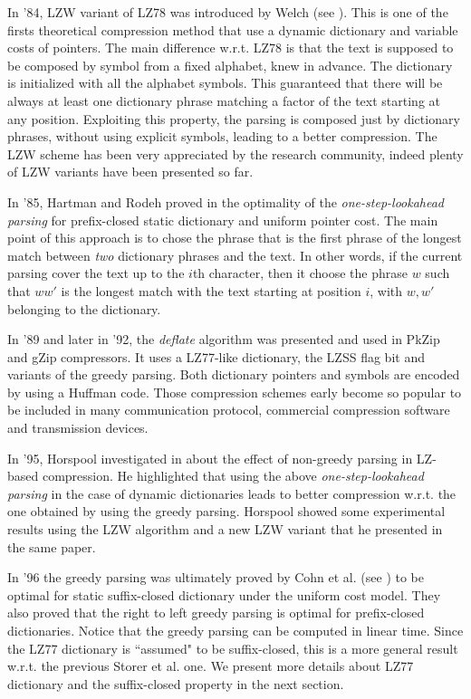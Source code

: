 \documentclass[12pt]{article}
\theoremstyle{plain}
\theoremstyle{definition}
\theoremstyle{remark}
\begin{document}
In '84, LZW variant of LZ78 was introduced by Welch (see \cite{lzw}). This is one of the firsts theoretical compression method that use a dynamic dictionary and variable costs of pointers. The main difference w.r.t. LZ78 is that the text is supposed to be composed by symbol from a fixed alphabet, knew in advance. The dictionary is initialized with all the alphabet symbols. This guaranteed that there will be always at least one dictionary phrase matching a factor of the text starting at any position. Exploiting this property, the parsing is composed just by dictionary phrases, without using explicit symbols, leading to a better compression. The LZW scheme has been very appreciated by the research community, indeed plenty of LZW variants have been presented so far.


In '85, Hartman and Rodeh proved in \cite{rodeh1985} the optimality of the 
\emph{one-step-lookahead parsing} for prefix-closed static dictionary and uniform pointer cost. The main point of this approach is to chose the phrase that is the first phrase of the longest match between \emph{two} dictionary phrases and the text. In other words, if the current parsing cover the text up to the $i$th character, then it choose the phrase $w$ such that $ww'$ is the longest match with the text starting at position $i$, with $w,w'$ belonging to the dictionary. 


In '89 and later in '92, the \emph{deflate} algorithm was presented and used in PkZip and gZip compressors. It uses a LZ77-like dictionary, the LZSS flag bit and variants of the greedy parsing. Both dictionary pointers and symbols are encoded by using a Huffman code. Those compression schemes early become so popular to be included in many communication protocol, commercial compression software and transmission devices. 

In '95, Horspool investigated in \cite{DBLP:conf/dcc/Horspool95} about the effect of non-greedy parsing in LZ-based compression. He highlighted that using the above \emph{one-step-lookahead parsing} in the case of dynamic dictionaries leads to better compression w.r.t. the one obtained by using the greedy parsing. Horspool showed some experimental results using the LZW algorithm and a new LZW variant that he presented in the same paper. 

In '96 the greedy parsing was ultimately proved by Cohn et al. (see \cite{DBLP:conf/dcc/CohnK96}) to be optimal for static suffix-closed dictionary under the uniform cost model. They also proved that the right to left greedy parsing is optimal for prefix-closed dictionaries. Notice that the greedy parsing can be computed in linear time. Since the LZ77 dictionary is ``assumed" to be suffix-closed, this is a more general result w.r.t. the previous Storer et al. one. We present more details about LZ77 dictionary and the suffix-closed property in the next section.
\end{document}
